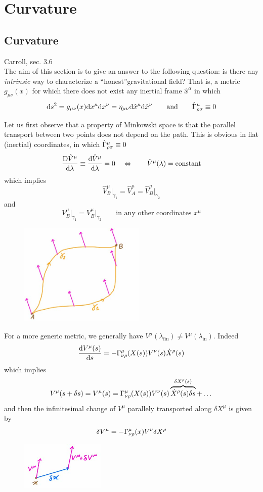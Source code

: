 \documentclass[../main/main.tex]{subfiles}
\begin{document}
\chapter{Curvature}


\section{Curvature}
\textsf{Carroll, sec. 3.6}\\

The aim of this section is to give an answer to the following question: is there any \emph{intrinsic} way to characterize a ``honest''gravitational field? That is, a metric $g_{\mu\nu}(x)$ for which there does not exist any inertial frame $\hat x^\alpha$ in which
\[\textup{d} s^2=g_{\mu\nu}(x)\textup{d} x^\mu\textup{d} x^\nu=\eta_{\mu\nu}\textup{d}\hat x^\mu\textup{d}\hat x^\nu\qquad\text{and}\qquad{\hat\Gamma}^{\mu}_{\rho \sigma}\equiv0\]

Let us first observe that a property of Minkowski space is that the parallel transport between two points does not depend on the path. This is obvious in flat (inertial) coordinates, in which ${\hat\Gamma}^{\mu}_{\rho \sigma}\equiv0$
\[\frac{\text{D}\hat V^\mu}{\textup{d}\lambda}\equiv\frac{\textup{d} \hat V^\mu}{\textup{d} \lambda}=0\quad\Leftrightarrow\qquad\hat V^\mu(\lambda)=\text{constant}\]
which implies
\[\hat V^\mu_B\vert_{\gamma_1}=\hat V_A^\mu=\hat V^\mu_B\vert_{\gamma_2}\]
and
\[V^\mu_B\vert_{\gamma_1}= V^\mu_B\vert_{\gamma_2}\qquad\text{in any other coordinates }x^\mu\]
%
\begin{figure}[H]
\centering
\includegraphics[width=6cm]{../img/curv-path-comm.jpg}
\end{figure}

For a more generic metric, we generally have $V^\mu(\lambda_{\text{fin}})\neq V^\mu(\lambda_{\text{in}})$. Indeed
\[\frac{\textup{d} V^\mu(s)}{\textup{d} s}=-{\Gamma}^{\mu}_{\nu \rho}(X(s))V^\nu(s)\dot X^\rho(s)\]
which implies
\[V^\mu(s+\delta s)=V^\mu(s)={\Gamma}^{\mu}_{\nu \rho}(X(s))V^\nu(s)\overbrace{\dot X^\rho(s)\delta s}^{\delta X^\rho(s)}+\dots\]
and then the infinitesimal change of $V^\mu$ parallely transported along $\delta X^\mu$ is given by
\[\delta V^\mu=-{\Gamma}^{\mu}_{\nu \rho}(x)V^\nu\delta X^\rho\]
%
\begin{figure}[H]
\centering
\includegraphics[width=4cm]{../img/curv-V-parall-trasp.jpg}
\end{figure}
\end{document}
